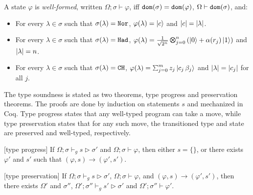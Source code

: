 \begin{definition}\label{def:well-formed}\rm 
  A state $\varphi$ is \emph{well-formed}, written
  $\Omega;\sigma \vdash \varphi$, iff $\mathtt{dom}(\sigma) = \mathtt{dom}(\varphi)$, $\Omega\vdash\mathtt{dom}(\sigma)$, and:
\begin{itemize}
\item For every $\lambda \in \sigma$ such that $\sigma(\lambda) = \texttt{Nor}$, $\varphi(\lambda)=\left\vert{c}\right\rangle$ and $|c|=|\lambda|$.

\item For every $\lambda \in \sigma$ such that $\sigma(\lambda) = \texttt{Had}$, $\varphi(\lambda)=\shad{2^n}{n}{\alpha(r_j)}$ and $|\lambda|=n$.

\item For every $\lambda \in \sigma$ such that $\sigma(\lambda) = \texttt{CH}$, $\varphi(\lambda)=\sch{m}{z_j}{c_j\,\beta_j}$ and $|\lambda|=|c_j|$ for all $j$.
\end{itemize}
\end{definition}

The \qafny type soundness is stated as two theorems, type progress and preservation theorems. The proofs are done by induction on \qafny statements $s$ and mechanized in Coq. Type progress states that any well-typed \qafny program can take a move, while type preservation states that for any such move, the transitioned type and state are preserved and well-typed, respectively.

\begin{theorem}\label{thm:type-progress-oqasm}[\qafny type progress]\rm 
If $\Omega;\sigma \vdash_g s \triangleright \sigma'$ and $\Omega;\sigma \vdash \varphi$, then either $s=\{\}$, or there exists $\varphi'$ and $s'$ such that $(\varphi,s)\longrightarrow (\varphi',s')$.
\end{theorem}

\begin{theorem}\label{thm:type-preservation-oqasm}[\qafny type preservation]\rm 
If $\Omega;\sigma \vdash_g s \triangleright \sigma'$, $\Omega;\sigma \vdash \varphi$, and $(\varphi,s)\longrightarrow (\varphi',s')$, then 
there exists $\Omega'$ and $\sigma''$, $\Omega';\sigma'' \vdash_g s' \triangleright \sigma'$ and $\Omega';\sigma'' \vdash \varphi'$.
\end{theorem}

